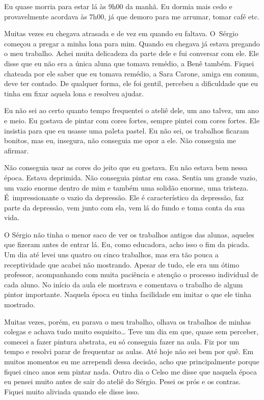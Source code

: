 Eu quase morria para estar lá às 9h00 da manhã. Eu dormia mais cedo e
provavelmente acordava às 7h00, já que demoro para me arrumar, tomar
café etc.

Muitas vezes eu chegava atrasada e de vez em quando eu faltava. O~Sérgio
começou a pregar a minha lona para mim. Quando eu chegava já estava
pregando o meu trabalho. Achei muita delicadeza da parte dele e fui
conversar com ele. Ele disse que eu não era a única aluna que tomava
remédio, a Benê também. Fiquei chateada por ele saber que eu tomava
remédio, a Sara Carone, amiga em comum, deve ter contado. De qualquer
forma, ele foi gentil, percebeu a dificuldade que eu tinha em fixar
aquela lona e resolveu ajudar.

Eu não sei ao certo quanto tempo frequentei o ateliê dele, um ano
talvez, um ano e meio. Eu gostava de pintar com cores fortes, sempre
pintei com cores fortes. Ele insistia para que eu usasse uma paleta
pastel. Eu não sei, os trabalhos ficaram bonitos, mas eu, insegura, não
conseguia me opor a ele. Não conseguia me afirmar.

Não conseguia usar as cores do jeito que eu gostava. Eu não estava bem
nessa época. Estava deprimida. Não conseguia pintar em casa. Sentia um
grande vazio, um vazio enorme dentro de mim e também uma solidão enorme,
uma tristeza. É~impressionante o vazio da depressão. Ele é
característico da depressão, faz parte da depressão, vem junto com ela,
vem lá do fundo e toma conta da sua vida.

O Sérgio não tinha o menor saco de ver os trabalhos antigos das alunas,
aqueles que fizeram antes de entrar lá. Eu, como educadora, acho isso o
fim da picada. Um dia até levei uns quatro ou cinco trabalhos, mas era
tão pouca a receptividade que acabei não mostrando. Apesar de tudo, ele
era um ótimo professor, acompanhando com muita paciência e atenção o
processo individual de cada aluno. No início da aula ele mostrava e
comentava o trabalho de algum pintor importante. Naquela época eu tinha
facilidade em imitar o que ele tinha mostrado.

Muitas vezes, porém, eu parava o meu trabalho, olhava os trabalhos de
minhas colegas e achava tudo muito esquisito… Teve um dia em que,
quase sem perceber, comecei a fazer pintura abstrata, eu só conseguia
fazer na aula. Fiz por um tempo e resolvi parar de frequentar as aulas.
Até hoje não sei bem por quê. Em muitos momentos eu me arrependi dessa
decisão, acho que principalmente porque fiquei cinco anos sem pintar
nada. Outro dia o Celso me disse que naquela época eu pensei muito
antes de sair do ateliê do Sérgio. Pesei os prós e os contras. Fiquei
muito aliviada quando ele disse isso.

